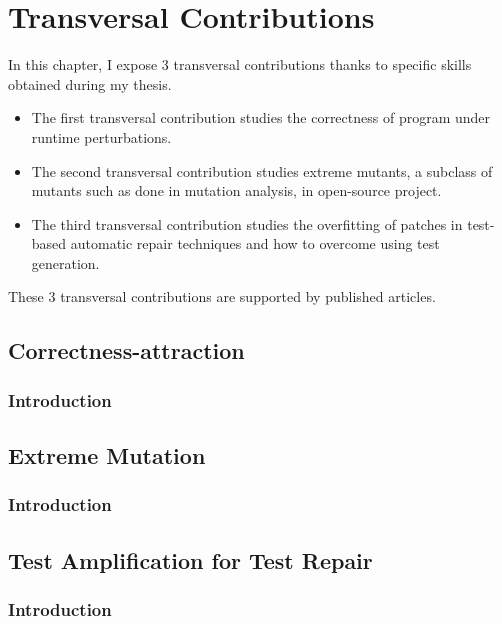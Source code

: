 \chapter{Transversal Contributions}
\label{chap:transversal-contributions}

\begin{chaptersummary}
	In this chapter, I expose 3 transversal contributions thanks to specific skills obtained during my thesis.
	\begin{itemize}
		\item The first transversal contribution studies the correctness of program under runtime perturbations.
		\item The second transversal contribution studies extreme mutants, \eg a subclass of mutants such as done in mutation analysis, in open-source project. 
		\item The third transversal contribution studies the overfitting of patches in test-based automatic repair techniques and how to overcome using test generation.
	\end{itemize}
	These 3 transversal contributions are supported by published articles.
\end{chaptersummary}

\minitoc

\graphicspath{{.}{chapitres/state-of-the-art/}}

\section{Correctness-attraction}
\label{sec:transversal-contributions:correctness}
\cite{Danglot2018}

\subsection{Introduction}
\label{subsec:transversal-contributions:correctness:introduction}

\section{Extreme Mutation}
\label{sec:transversal-contributions:descartes}
\cite{descartes}

\subsection{Introduction}
\label{subsec:transversal-contributions:descartes:introduction}

\section{Test Amplification for Test Repair}
\label{sec:transversal-contributions:test-for-repair}
\cite{Yu2019}

\subsection{Introduction}
\label{subsec:transversal-contributions:test-for-repair:introduction}

